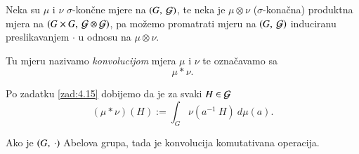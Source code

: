 \begin{defn}    \label{defn:7.11-2}
    Neka su $\mu$ i $\nu$ $\sigma$-kon\v cne mjere na $({G}, \: {\mathcal{G}})$, te neka je $\mu \otimes \nu$ ($\sigma$-kona\v cna) produktna mjera na $({G \times G}, \: {\mathcal{G} \otimes \mathcal{G}})$, pa mo\v zemo promatrati mjeru na $({G}, \: {\mathcal{G}})$ induciranu preslikavanjem $\cdot$ u odnosu na $\mu \otimes \nu$.
    
    Tu mjeru nazivamo \emph{konvolucijom} mjera $\mu$ i $\nu$ te ozna\v cavamo sa
    \begin{equation*}
        \mu * \nu.
    \end{equation*}
\end{defn}

Po zadatku \ref{zad:4.15} dobijemo da je za svaki $H \in \mathcal{G}$
\begin{equation*}   \label{jed:7.12}
    (\mu * \nu)(H) := \int_G \nu (a^{-1} \: H) \: d \mu (a).
\end{equation*}

\begin{zad} \label{zad:7.13}
    Ako je $({G}, \: {\cdot})$ Abelova grupa, tada je konvolucija komutativana operacija.
\end{zad}

